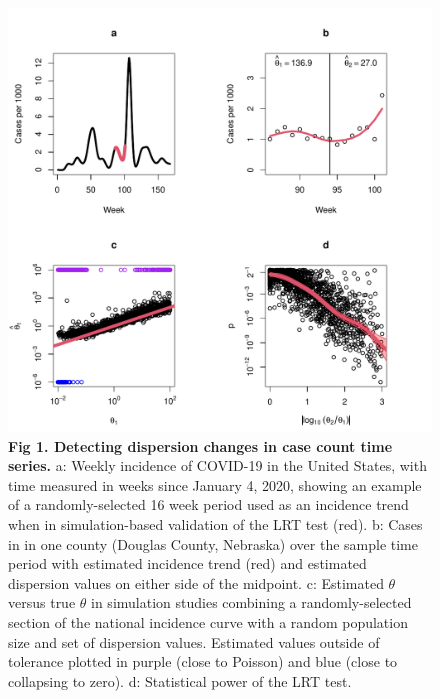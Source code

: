 \documentclass[11pt,letterpaper]{article}
\begin{document}
\clearpage
\begin{figure}[!ht]
\includegraphics[width=1\textwidth]{fig1}
\caption{{\bf Fig 1. Detecting dispersion changes in case count time series.}
a: Weekly incidence of COVID-19 in the United States, with time measured in weeks since January 4, 2020, showing an example of a randomly-selected 16 week period used as an incidence trend when in simulation-based validation of the LRT test (red). 
b: Cases in in one county (Douglas County, Nebraska) over the sample time period with estimated incidence trend (red) and estimated dispersion values on either side of the midpoint. 
c: Estimated $\theta$ versus true $\theta$ in simulation studies combining a randomly-selected section of the national incidence curve with a random population size and set of dispersion values. Estimated values outside of tolerance plotted in purple (close to Poisson) and blue (close to collapsing to zero). 
d: Statistical power of the LRT test.}\label{fig1}
\end{figure}
\clearpage
\end{document}
